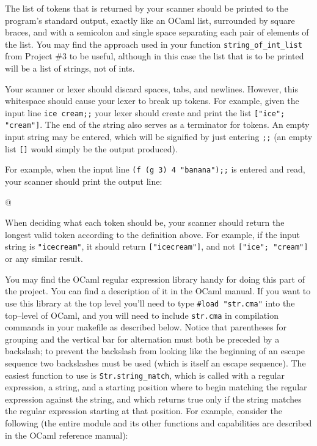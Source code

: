 \documentclass[11pt]{article}
\begin{document}
    \vspace{-1.5mm}

    The list of tokens that is returned by your scanner should be printed to
  the program's standard output, exactly like an OCaml list, surrounded by
  square braces, and with a semicolon and single space separating each pair
  of elements of the list.  You may find the approach used in your function
  \texttt{string\_of\_int\_list} from Project \#3 to be useful, although in
  this case the list that is to be printed will be a list of strings, not of
  ints.

    Your scanner or lexer should discard spaces, tabs, and newlines.  However,
  this whitespace should cause your lexer to break up tokens.  For example,
  given the input line \texttt{ice cream;;} your lexer should create and
  print the list \texttt{["ice"; "cream"]}.  The end of the string also
  serves as a terminator for tokens.  An empty input string may be entered,
  which will be signified by just entering \texttt{;;} (an empty list
  \texttt{[]} would simply be the output produced).

    For example, when the input line \texttt{(f (g 3) 4 "banana");;} is
  entered and read, your scanner should print the output line:

    \vspace{-4mm}

    \begin{center}

      \verb@[(; f; (; g; 3; ); 4; "banana"; )]@

    \end{center}

    \vspace{-1mm}

    When deciding what each token should be, your scanner should return the
  longest valid token according to the definition above.  For example, if
  the input string is \texttt{"icecream"}, it should return
  \texttt{["icecream"]}, and not \texttt{["ice"; "cream"]} or any similar
  result.

    You may find the OCaml regular expression library handy for doing this
  part of the project.  You can find a description of it in the OCaml
  manual.  If you want to use this library at the top level you'll need to
  type \texttt{\#load "str.cma"} into the top--level of OCaml, and you will
  need to include \texttt{str.cma} in compilation commands in your makefile
  as described below.  Notice that parentheses for grouping and the vertical
  bar for alternation must both be preceded by a backslash; to prevent the
  backslash from looking like the beginning of an escape sequence two
  backslashes must be used (which is itself an escape sequence).  The
  easiest function to use is \texttt{Str.string\_match}, which is called
  with a regular expression, a string, and a starting position where to
  begin matching the regular expression against the string, and which
  returns true only if the string matches the regular expression starting at
  that position.  For example, consider the following (the entire module and
  its other functions and capabilities are described in the OCaml reference
  manual):
\end{document}

